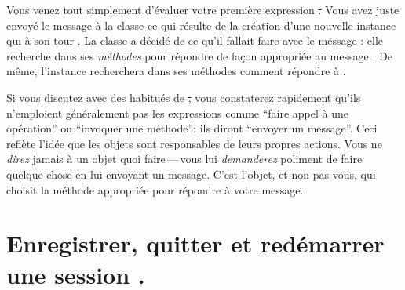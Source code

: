 \documentclass[a4paper,10pt,twoside]{book}
\begin{document}
Vous venez tout simplement d'évaluer votre première expression \st. 
Vous avez juste envoyé le message  à la classe \bam 
ce qui résulte de la création d'une nouvelle instance qui à 
son tour 
\mbox{.} %
La classe \bam{} a décidé de ce qu'il fallait faire avec le message
: elle recherche dans ses \emph{méthodes} pour répondre de
façon appropriée au message 
.
De même, l'instance \bam recherchera dans ses méthodes comment
répondre à \mbox{.}

Si vous discutez avec des habitués de \st, vous constaterez rapidement
qu'ils n'emploient généralement pas les expressions comme ``faire appel
à une opération'' ou ``invoquer une méthode'': ils diront ``envoyer
un message''.
Ceci reflète l'idée que les objets sont responsables de leurs propres actions.
Vous ne \emph{direz} jamais à un objet quoi faire\,---\,vous lui
\emph{demanderez} poliment de faire quelque chose en lui envoyant un message.
C'est l'objet, et non pas vous, qui choisit la méthode appropriée pour
répondre à votre message.

\section{Enregistrer, quitter et redémarrer une session \pharo.}
\end{document}
